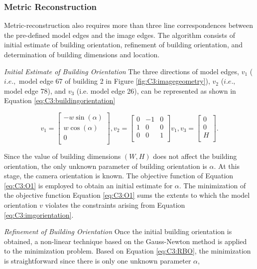 \subsubsection{Metric Reconstruction}

Metric-reconstruction also requires more than three line correspondences between the pre-defined model edges and the image edges.  The algorithm consists of initial estimate of building orientation, refinement of building orientation, and determination of building dimensions and location.  

{\it Initial Estimate of Building Orientation} The three directions of model edges, $v_1$ ($i.e.,$ model edge 67 of building 2 in Figure \ref{fig:C3:imagegeometry}), $v_2$ ($i.e.,$ model edge 78), and $v_3$ (i.e. model edge 26), can be represented as shown in Equation \ref{eq:C3:buildingorientation}

\begin{equation}
v_1 =
\begin{bmatrix}
-w\sin(\alpha)  \\
w\cos(\alpha)  \\
0 \\
\end{bmatrix},
v_2 =
\begin{bmatrix}
0 & -1 & 0  \\
1 & 0 & 0 \\
0 & 0 & 1 \\
\end{bmatrix} v_1,
v_3 =
\begin{bmatrix}
0 \\
0 \\
H \\
\end{bmatrix}.
\label{eq:C3:buildingorientation}
\end{equation}   

Since the value of building dimensions $(W, H)$ does not affect the building orientation, the only unknown parameter of building orientation is $\alpha$. At this stage, the camera orientation is known. The objective function of Equation \ref {eq:C3:O1} is employed to obtain an initial estimate for $\alpha$. The minimization of the objective function Equation \ref {eq:C3:O1} sums the extents to which the model orientation $v$ violates the constraints arising from Equation \ref{eq:C3:imgorientation}.

{\it Refinement of Building Orientation} Once the initial building orientation is obtained, a non-linear technique based on the Gauss-Newton method is applied to the minimization problem. Based on Equation \ref{eq:C3:RBO}, the minimization is straightforward since there is only one unknown parameter $\alpha$,

